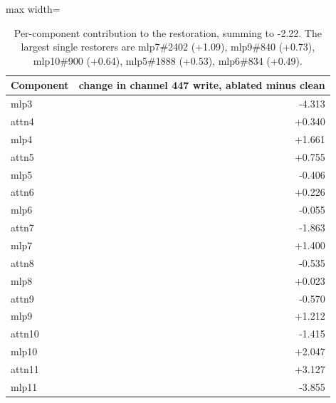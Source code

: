 \begin{table}[H]\centering\small
\caption{Per-component contribution to the restoration, summing to -2.22. The largest single restorers are mlp7\#2402 (+1.09), mlp9\#840 (+0.73), mlp10\#900 (+0.64), mlp5\#1888 (+0.53), mlp6\#834 (+0.49).}\label{app:compensate}
\begin{adjustbox}{max width=\linewidth}
\begin{tabular}{lr}\toprule
Component & change in channel 447 write, ablated minus clean \\ \midrule
mlp3 & -4.313 \\
attn4 & +0.340 \\
mlp4 & +1.661 \\
attn5 & +0.755 \\
mlp5 & -0.406 \\
attn6 & +0.226 \\
mlp6 & -0.055 \\
attn7 & -1.863 \\
mlp7 & +1.400 \\
attn8 & -0.535 \\
mlp8 & +0.023 \\
attn9 & -0.570 \\
mlp9 & +1.212 \\
attn10 & -1.415 \\
mlp10 & +2.047 \\
attn11 & +3.127 \\
mlp11 & -3.855 \\
\bottomrule\end{tabular}\end{adjustbox}
\end{table}
